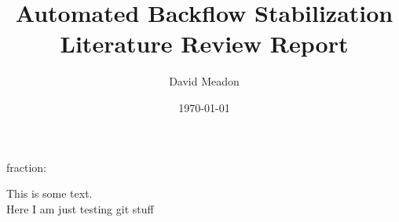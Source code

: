 \documentclass{article}
\title{Automated Backflow Stabilization\\
{\small Literature Review Report}}
\author{David Meadon}
\date{\today}
\begin{document}
\maketitle
fraction: 

This is some text.\\
Here I am just testing git stuff
\end{document}
